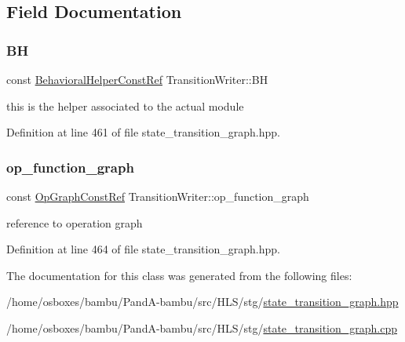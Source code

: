 \subsection{Field Documentation}
\mbox{\label{classTransitionWriter_a7c2e326a9300c1c6c850f499f65495dd}} 
\subsubsection{\texorpdfstring{BH}{BH}}
{\footnotesize\ttfamily const \hyperlink{behavioral__helper_8hpp_aae973b54cac87eef3b27442aa3e1e425}{Behavioral\+Helper\+Const\+Ref} Transition\+Writer\+::\+BH\hspace{0.3cm}{\ttfamily [private]}}



this is the helper associated to the actual module 



Definition at line 461 of file state\+\_\+transition\+\_\+graph.\+hpp.

\mbox{\label{classTransitionWriter_aa286544e78604b043971682c8dfc2c08}} 
\subsubsection{\texorpdfstring{op\+\_\+function\+\_\+graph}{op\_function\_graph}}
{\footnotesize\ttfamily const \hyperlink{op__graph_8hpp_a9a0b240622c47584bee6951a6f5de746}{Op\+Graph\+Const\+Ref} Transition\+Writer\+::op\+\_\+function\+\_\+graph\hspace{0.3cm}{\ttfamily [private]}}



reference to operation graph 



Definition at line 464 of file state\+\_\+transition\+\_\+graph.\+hpp.



The documentation for this class was generated from the following files\+:\begin{DoxyCompactItemize}
\item 
/home/osboxes/bambu/\+Pand\+A-\/bambu/src/\+H\+L\+S/stg/\hyperlink{state__transition__graph_8hpp}{state\+\_\+transition\+\_\+graph.\+hpp}\item 
/home/osboxes/bambu/\+Pand\+A-\/bambu/src/\+H\+L\+S/stg/\hyperlink{state__transition__graph_8cpp}{state\+\_\+transition\+\_\+graph.\+cpp}\end{DoxyCompactItemize}
